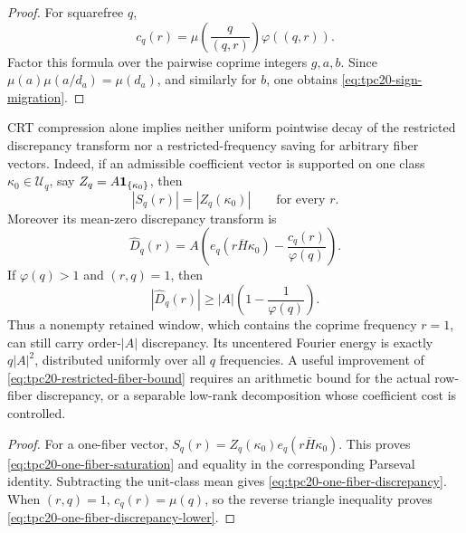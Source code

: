 \begin{proof}
For squarefree \(q\),
\[
 c_q(r)=\mu\!\left(\frac{q}{(q,r)}\right)\varphi((q,r)).
\]
Factor this formula over the pairwise coprime integers \(g,a,b\).  Since
\(\mu(a)\mu(a/d_a)=\mu(d_a)\), and similarly for \(b\), one obtains
\eqref{eq:tpc20-sign-migration}.
\end{proof}

\begin{proposition}
\label{prop:tpc20-fiber-nogo}
CRT compression alone implies neither uniform pointwise decay of the
restricted discrepancy transform nor a restricted-frequency saving for
arbitrary fiber vectors.  Indeed, if an admissible coefficient
vector is supported on one class \(\kappa_0\in\mathcal U_q\), say
\(Z_q=A\mathbf 1_{\{\kappa_0\}}\), then
\begin{equation}
 |S_q(r)|=|Z_q(\kappa_0)|
 \qquad\text{for every }r.
 \label{eq:tpc20-one-fiber-saturation}
\end{equation}
Moreover its mean-zero discrepancy transform is
\begin{equation}
 \widehat D_q(r)
 =A\left(
 e_q(r\overline H\kappa_0)-\frac{c_q(r)}{\varphi(q)}
 \right).
 \label{eq:tpc20-one-fiber-discrepancy}
\end{equation}
If \(\varphi(q)>1\) and \((r,q)=1\), then
\begin{equation}
 |\widehat D_q(r)|
 \ge |A|\left(1-\frac1{\varphi(q)}\right).
 \label{eq:tpc20-one-fiber-discrepancy-lower}
\end{equation}
Thus a nonempty retained window, which contains the coprime frequency
\(r=1\), can still carry order-\(|A|\) discrepancy.
Its uncentered Fourier energy is exactly \(q|A|^2\), distributed
uniformly over all \(q\) frequencies.  A useful improvement of
\eqref{eq:tpc20-restricted-fiber-bound} requires an arithmetic bound for
the actual row-fiber discrepancy, or a separable low-rank decomposition
whose coefficient cost is controlled.
\end{proposition}

\begin{proof}
For a one-fiber vector,
\(S_q(r)=Z_q(\kappa_0)e_q(r\overline H\kappa_0)\).  This proves
\eqref{eq:tpc20-one-fiber-saturation} and equality in the corresponding
Parseval identity.  Subtracting the unit-class mean gives
\eqref{eq:tpc20-one-fiber-discrepancy}.  When \((r,q)=1\),
\(c_q(r)=\mu(q)\), so the reverse triangle inequality proves
\eqref{eq:tpc20-one-fiber-discrepancy-lower}.
\end{proof}

